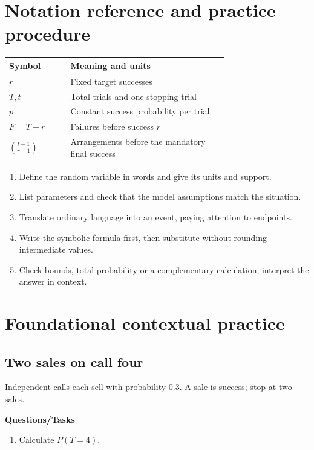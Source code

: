 \section{Notation reference and practice procedure}
\begin{center}
\begin{tabular}{lp{0.72\linewidth}}
\toprule
Symbol & Meaning and units \\ \midrule
$r$ & Fixed target successes \\
$T,t$ & Total trials and one stopping trial \\
$p$ & Constant success probability per trial \\
$F=T-r$ & Failures before success $r$ \\
$\binom{t-1}{r-1}$ & Arrangements before the mandatory final success \\
\bottomrule
\end{tabular}
\end{center}
\begin{enumerate}
\item Define the random variable in words and give its units and support.
\item List parameters and check that the model assumptions match the situation.
\item Translate ordinary language into an event, paying attention to endpoints.
\item Write the symbolic formula first, then substitute without rounding intermediate values.
\item Check bounds, total probability or a complementary calculation; interpret the answer in context.
\end{enumerate}
\section{Foundational contextual practice}\label{sec:t2-c6-foundational}
\subsection{Two sales on call four}
Independent calls each sell with probability 0.3. A sale is success; stop at two sales.

\textbf{Questions/Tasks}
\begin{enumerate}
\item Calculate $P(T=4)$. 
\end{enumerate}
